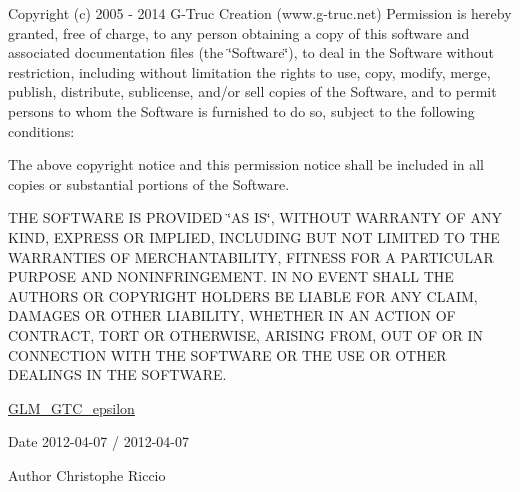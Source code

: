 Copyright (c) 2005 -\/ 2014 G-\/\-Truc Creation (www.\-g-\/truc.\-net) Permission is hereby granted, free of charge, to any person obtaining a copy of this software and associated documentation files (the \char`\"{}\-Software\char`\"{}), to deal in the Software without restriction, including without limitation the rights to use, copy, modify, merge, publish, distribute, sublicense, and/or sell copies of the Software, and to permit persons to whom the Software is furnished to do so, subject to the following conditions\-:

The above copyright notice and this permission notice shall be included in all copies or substantial portions of the Software.

T\-H\-E S\-O\-F\-T\-W\-A\-R\-E I\-S P\-R\-O\-V\-I\-D\-E\-D \char`\"{}\-A\-S I\-S\char`\"{}, W\-I\-T\-H\-O\-U\-T W\-A\-R\-R\-A\-N\-T\-Y O\-F A\-N\-Y K\-I\-N\-D, E\-X\-P\-R\-E\-S\-S O\-R I\-M\-P\-L\-I\-E\-D, I\-N\-C\-L\-U\-D\-I\-N\-G B\-U\-T N\-O\-T L\-I\-M\-I\-T\-E\-D T\-O T\-H\-E W\-A\-R\-R\-A\-N\-T\-I\-E\-S O\-F M\-E\-R\-C\-H\-A\-N\-T\-A\-B\-I\-L\-I\-T\-Y, F\-I\-T\-N\-E\-S\-S F\-O\-R A P\-A\-R\-T\-I\-C\-U\-L\-A\-R P\-U\-R\-P\-O\-S\-E A\-N\-D N\-O\-N\-I\-N\-F\-R\-I\-N\-G\-E\-M\-E\-N\-T. I\-N N\-O E\-V\-E\-N\-T S\-H\-A\-L\-L T\-H\-E A\-U\-T\-H\-O\-R\-S O\-R C\-O\-P\-Y\-R\-I\-G\-H\-T H\-O\-L\-D\-E\-R\-S B\-E L\-I\-A\-B\-L\-E F\-O\-R A\-N\-Y C\-L\-A\-I\-M, D\-A\-M\-A\-G\-E\-S O\-R O\-T\-H\-E\-R L\-I\-A\-B\-I\-L\-I\-T\-Y, W\-H\-E\-T\-H\-E\-R I\-N A\-N A\-C\-T\-I\-O\-N O\-F C\-O\-N\-T\-R\-A\-C\-T, T\-O\-R\-T O\-R O\-T\-H\-E\-R\-W\-I\-S\-E, A\-R\-I\-S\-I\-N\-G F\-R\-O\-M, O\-U\-T O\-F O\-R I\-N C\-O\-N\-N\-E\-C\-T\-I\-O\-N W\-I\-T\-H T\-H\-E S\-O\-F\-T\-W\-A\-R\-E O\-R T\-H\-E U\-S\-E O\-R O\-T\-H\-E\-R D\-E\-A\-L\-I\-N\-G\-S I\-N T\-H\-E S\-O\-F\-T\-W\-A\-R\-E.

\hyperlink{group__gtc__epsilon}{G\-L\-M\-\_\-\-G\-T\-C\-\_\-epsilon}

\begin{DoxyDate}{Date}
2012-\/04-\/07 / 2012-\/04-\/07 
\end{DoxyDate}
\begin{DoxyAuthor}{Author}
Christophe Riccio 
\end{DoxyAuthor}

